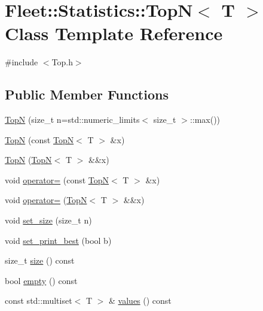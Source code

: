 \hypertarget{class_fleet_1_1_statistics_1_1_top_n}{}\section{Fleet\+:\+:Statistics\+:\+:TopN$<$ T $>$ Class Template Reference}
\label{class_fleet_1_1_statistics_1_1_top_n}


{\ttfamily \#include $<$Top.\+h$>$}

\subsection*{Public Member Functions}
\begin{DoxyCompactItemize}
\item 
\hyperlink{class_fleet_1_1_statistics_1_1_top_n_afd0ca4daca84e66e91a4101cb009af44}{TopN} (size\+\_\+t n=std\+::numeric\+\_\+limits$<$ size\+\_\+t $>$\+::max())
\item 
\hyperlink{class_fleet_1_1_statistics_1_1_top_n_a3c7b5c9c3fd6e171a0b2d6b1f48cddf3}{TopN} (const \hyperlink{class_fleet_1_1_statistics_1_1_top_n}{TopN}$<$ T $>$ \&x)
\item 
\hyperlink{class_fleet_1_1_statistics_1_1_top_n_af1a27643fa0841afaa7e8ca0e87d9a49}{TopN} (\hyperlink{class_fleet_1_1_statistics_1_1_top_n}{TopN}$<$ T $>$ \&\&x)
\item 
void \hyperlink{class_fleet_1_1_statistics_1_1_top_n_a38d3aba302a215992c603ff2ab13e8fc}{operator=} (const \hyperlink{class_fleet_1_1_statistics_1_1_top_n}{TopN}$<$ T $>$ \&x)
\item 
void \hyperlink{class_fleet_1_1_statistics_1_1_top_n_a6653acde6effd65aa0226cbefc2c8f4f}{operator=} (\hyperlink{class_fleet_1_1_statistics_1_1_top_n}{TopN}$<$ T $>$ \&\&x)
\item 
void \hyperlink{class_fleet_1_1_statistics_1_1_top_n_a3151da8c2aaab75195d6f702fbfba436}{set\+\_\+size} (size\+\_\+t n)
\item 
void \hyperlink{class_fleet_1_1_statistics_1_1_top_n_a762c937fe5dcab09d87d2414201b6b1e}{set\+\_\+print\+\_\+best} (bool b)
\item 
size\+\_\+t \hyperlink{class_fleet_1_1_statistics_1_1_top_n_a0ce96f95fbac59ba2a858b66b5a6690a}{size} () const
\item 
bool \hyperlink{class_fleet_1_1_statistics_1_1_top_n_ac2b70eef6c75a0459acc88b2539dbc0b}{empty} () const
\item 
const std\+::multiset$<$ T $>$ \& \hyperlink{class_fleet_1_1_statistics_1_1_top_n_ab7ab88abe1dd8afe6ffecf9206cbceb7}{values} () const

\end{DoxyCompactItemize}
